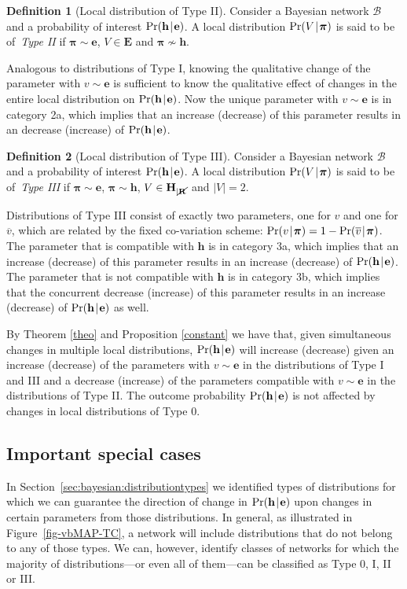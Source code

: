 \documentclass[10pt,a4paper]{paper}
\theoremstyle{definition}
\newtheorem{defi}{Definition}
\newcommand{\bpi}{\boldsymbol\pi}
\newcommand{\vbpi}{\boldsymbol\pi}
\newcommand{\hyp}{\mathbf{h}}
\newcommand{\ev}{\mathbf{e}}
\newcommand{\hyps}{\mathbf{H}}
\newcommand{\evs}{\mathbf{E}}
\newcommand{\restr}{_{|\cancel{\bf R}}}
\newcommand{\newmid}{\hspace{0.9pt}\vert\hspace{0.9pt}}
\begin{document}
\begin{defi}[Local distribution of Type II]\label{def:local:type2}
Consider a Bayesian network ${\mathcal B}$ and a probability of interest $\Pr(\hyp\newmid\ev)$. A local distribution $\Pr(V\newmid \vbpi)$ is said to be of\, \emph{Type II} if\/ $\vbpi\sim\ev$, $V\in \evs$ and $\vbpi\nsim\hyp$.
\end{defi}
Analogous to distributions of Type I, knowing the qualitative change of the parameter with $v\sim\ev$ is sufficient to know the qualitative effect of changes in the entire local distribution on $\Pr(\hyp\newmid\ev)$. Now the unique parameter with $v\sim\ev$ is in category 2a, which implies that an increase (decrease) of this parameter results in an decrease (increase) of $\Pr(\hyp\newmid\ev)$. 

\begin{defi}[Local distribution of Type III]\label{def:local:type4}
Consider a Bayesian network ${\mathcal B}$ and a probability of interest $\Pr(\hyp\newmid\ev)$. A local distribution $\Pr(V\newmid \vbpi)$ is said to be of\, \emph{Type III} if\/ $\vbpi\sim\ev$, $\vbpi\sim\hyp$, $V\in \hyps\restr$ and $\vert V\vert =2$.
\end{defi}
Distributions of Type III consist of exactly two parameters, one for $v$ and one for $\overline{v}$, which are related by the fixed co-variation scheme: $\Pr(v\newmid{\bpi})=1-\Pr(\overline{v}\newmid\bpi)$. The parameter that is compatible with $\hyp$ is in category 3a, which implies that an increase (decrease) of this parameter results in an increase (decrease) of $\Pr(\hyp\newmid\ev)$. The parameter that is not compatible with $\hyp$ is in category 3b, which implies that the concurrent decrease (increase) of this parameter results in an increase (decrease) of $\Pr(\hyp\newmid\ev)$ as well.

\bigskip
By Theorem \ref{theo} and Proposition \ref{constant} we have that, given simultaneous changes in multiple local distributions, $\Pr(\hyp\newmid\ev)$ will increase (decrease) given an increase (decrease) of the parameters with $v\sim\ev$ in the distributions of Type I and III and a decrease (increase) of the parameters compatible with $v\sim\ev$ in the distributions of Type II. The outcome probability $\Pr(\hyp\newmid\ev)$ is not affected by changes in local distributions of Type 0. 

\subsection{Important special cases}\label{sec:bayesian:specialcase}
In Section~\ref{sec:bayesian:distributiontypes} we identified types of distributions for which we can guarantee the direction of change in $\Pr(\hyp\newmid\ev)$ upon changes in certain parameters from those distributions. In general, as illustrated in Figure~\ref{fig-vbMAP-TC}, a network will include distributions that do not belong to any of those types. We can, however, identify classes of networks for which the majority of distributions---or even all of them---can be classified as Type 0, I, II or III.
\end{document}
